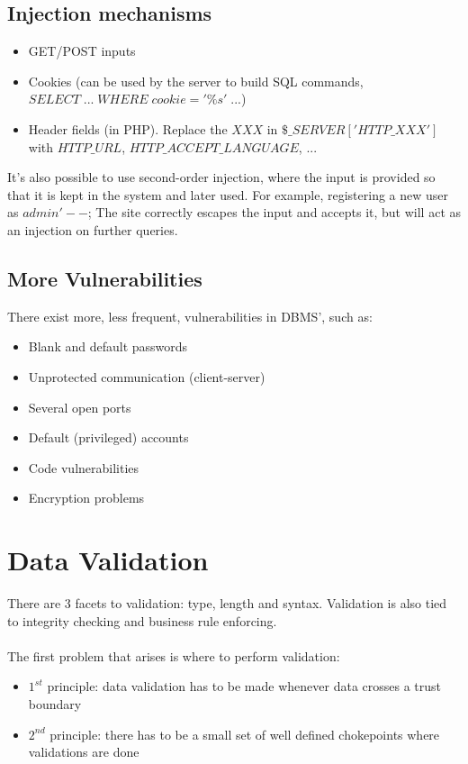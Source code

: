 \documentclass[10pt,a4paper]{report}
\begin{document}
\subsection{Injection mechanisms}
\begin{itemize}
\item GET/POST inputs
\item Cookies (can be used by the server to build SQL commands, $SELECT \; ... \; WHERE \; cookie='\%s'\; ...$)
\item Header fields (in PHP). Replace the $XXX$ in $\$\_SERVER['HTTP\_XXX']$ with $HTTP\_URL$, $HTTP\_ACCEPT\_LANGUAGE$, ...
\end{itemize}
It's also possible to use second-order injection, where the input is provided so that it is kept in the system and later used. For example, registering a new user as $admin'--$; The site correctly escapes the input and accepts it, but will act as an injection on further queries.
\subsection{More Vulnerabilities}
There exist more, less frequent, vulnerabilities in DBMS', such as:
\begin{itemize}
\item Blank and default passwords
\item Unprotected communication (client-server)
\item Several open ports
\item Default (privileged) accounts
\item Code vulnerabilities
\item Encryption problems
\end{itemize}
\section{Data Validation}
There are 3 facets to validation: type, length and syntax. Validation is also tied to integrity checking and business rule enforcing.\\
\\
The first problem that arises is where to perform validation:
\begin{itemize}
\item $1^{st}$ principle: data validation has to be made whenever data crosses a trust boundary
\item $2^{nd}$ principle: there has to be a small set of well defined chokepoints where validations are done
\end{itemize}
\end{document}
